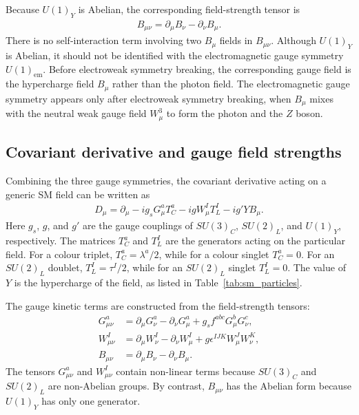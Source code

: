 Because $U(1)_{Y}$ is Abelian, the corresponding field-strength tensor is
\begin{align}
    B_{\mu\nu}
    =
    \partial_{\mu}B_{\nu}
    -
    \partial_{\nu}B_{\mu}.
    \label{eq:u1y_field_strength}
\end{align}
There is no self-interaction term involving two $B_{\mu}$ fields in $B_{\mu\nu}$.
Although $U(1)_{Y}$ is Abelian, it should not be identified with the electromagnetic gauge symmetry $U(1)_{\mathrm{em}}$. 
Before electroweak symmetry breaking, the corresponding gauge field is the hypercharge field $B_{\mu}$ rather than the photon field. 
The electromagnetic gauge symmetry appears only after electroweak symmetry breaking, when $B_{\mu}$ mixes with the neutral weak gauge field $W_{\mu}^{3}$ to form the photon and the $Z$ boson.


\subsection{Covariant derivative and gauge field strengths}
\label{subsec:covariant_derivative_field_strengths}

Combining the three gauge symmetries, the covariant derivative acting on a generic SM field can be written as
\begin{align}
    D_{\mu}
    =
    \partial_{\mu}
    -
    ig_{s}G_{\mu}^{a}T_{C}^{a}
    -
    igW_{\mu}^{I}T_{L}^{I}
    -
    ig'YB_{\mu}.
    \label{eq:sm_covariant_derivative}
\end{align}
Here $g_{s}$, $g$, and $g'$ are the gauge couplings of $SU(3)_{C}$, $SU(2)_{L}$, and $U(1)_{Y}$, respectively. 
The matrices $T_{C}^{a}$ and $T_{L}^{I}$ are the generators acting on the particular field. 
For a colour triplet, $T_{C}^{a}=\lambda^{a}/2$, while for a colour singlet $T_{C}^{a}=0$. 
For an $SU(2)_{L}$ doublet, $T_{L}^{I}=\tau^{I}/2$, while for an $SU(2)_{L}$ singlet $T_{L}^{I}=0$. 
The value of $Y$ is the hypercharge of the field, as listed in Table~\ref{tab:sm_particles}.

The gauge kinetic terms are constructed from the field-strength tensors:
\begin{align}
    G_{\mu\nu}^{a}
    &=
    \partial_{\mu}G_{\nu}^{a}
    -
    \partial_{\nu}G_{\mu}^{a}
    +
    g_{s}f^{abc}G_{\mu}^{b}G_{\nu}^{c},
    \\
    W_{\mu\nu}^{I}
    &=
    \partial_{\mu}W_{\nu}^{I}
    -
    \partial_{\nu}W_{\mu}^{I}
    +
    g\epsilon^{IJK}W_{\mu}^{J}W_{\nu}^{K},
    \\
    B_{\mu\nu}
    &=
    \partial_{\mu}B_{\nu}
    -
    \partial_{\nu}B_{\mu}.
    \label{eq:sm_field_strengths}
\end{align}
The tensors $G_{\mu\nu}^{a}$ and $W_{\mu\nu}^{I}$ contain non-linear terms because $SU(3)_{C}$ and $SU(2)_{L}$ are non-Abelian groups. 
By contrast, $B_{\mu\nu}$ has the Abelian form because $U(1)_{Y}$ has only one generator.

